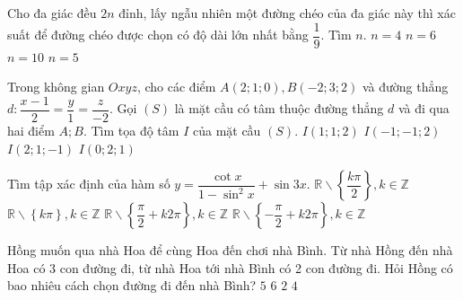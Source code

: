 \begin{ex}%
	Cho đa giác đều $2n$ đỉnh, lấy ngẫu nhiên một đường chéo của đa giác này thì xác suất để đường chéo được chọn có độ dài lớn nhất bằng $\dfrac{1}{9}$. Tìm $n$.
	\choice
	{ $n=4$}
	{\True $n=6$}
	{ $n=10$}
	{ $n=5$}
\end{ex}
\begin{ex}%
	Trong không gian $Oxyz$, cho các điểm $A(2; 1; 0), B(-2; 3; 2)$ và đường thẳng $d:\dfrac{x-1}{2}=\dfrac{y}{1}=\dfrac{z}{-2}$. Gọi $(S )$ là mặt cầu có tâm thuộc đường thẳng $d$ và đi qua hai điểm $A; B$. Tìm tọa độ tâm $I$ của mặt cầu $(S)$.
	\choice
	{$I(1;1;2)$ }
	{\True $I(-1;-1;2)$ }
	{ $I(2;1;-1)$}
	{ $I(0;2;1)$}
\end{ex}
\begin{ex}%
	Tìm tập xác định của hàm số $y=\dfrac{\cot x}{1-\sin ^2x}+\sin 3x$.
	\choice
	{\True $\mathbb{R} \backslash \left\{ \dfrac{k\pi}{2} \right\}, k\in \mathbb{Z}$}
	{ $\mathbb{R}\backslash \left\{k\pi \right\}, k\in \mathbb{Z}$}
	{ $\mathbb{R}\backslash \left\{ \dfrac{\pi}{2} +k2\pi \right\}, k\in \mathbb{Z}$}
	{ $\mathbb{R}\backslash \left\{ -\dfrac{\pi}{2} +k2\pi \right\}, k\in \mathbb{Z}$}
\end{ex}
\begin{ex}%
	Hồng muốn qua nhà Hoa để cùng Hoa đến chơi nhà Bình. Từ nhà Hồng đến nhà Hoa có 3 con đường đi, từ nhà Hoa tới nhà Bình có 2 con đường đi. Hỏi Hồng có bao nhiêu cách chọn đường đi đến nhà Bình?
	\choice
	{ $5$}
	{\True $6$}
	{ $2$}
	{ $4$}
\end{ex}
